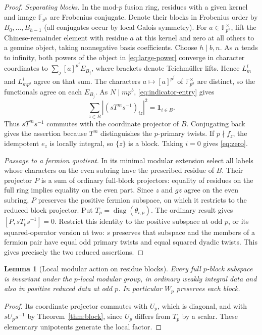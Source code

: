 \documentclass[11pt,a4paper]{article}
\numberwithin{equation}{section}
\newtheorem{lemma}[theorem]{Lemma}
\theoremstyle{remark}
\begin{document}
\begin{proof}
\emph{Separating blocks.}
In the mod-$p$ fusion ring, residues with a given kernel and image
$\mathbb F_{p^h}$ are Frobenius conjugate. Denote their blocks
in Frobenius order by $B_0,\ldots,B_{h-1}$ (all conjugates occur
by local Galois symmetry). For $a\in\mathbb F_{p^h}^{\times}$,
lift the Chinese-remainder element with residue $a$ at this kernel
and zero at all others to a genuine object, taking nonnegative
basis coefficients. Choose $h\mid b,n$. As $n$ tends to infinity,
both powers of the object in \eqref{eq:large-power} converge in
character coordinates to $\sum_j[a]^{p^j}E_{B_j}$, where brackets
denote Teichm\"uller lifts. Hence $L_m^i$ and $L_{mp^b}^i$ agree
on that sum. The characters $a\mapsto[a]^{p^j}$ of
$\mathbb F_{p^h}^\times$ are distinct, so the functionals agree on
each $E_{B_j}$. As $N\mid mp^b$, \eqref{eq:indicator-entry} gives
\begin{equation}\label{eq:block-projector-mass}
 \sum_{z\in B}|(sT^ms^{-1})_{iz}|^2=\mathbf1_{i\in B}.
\end{equation}
Thus $sT^ms^{-1}$ commutes with the coordinate projector of $B$.
Conjugating back gives the assertion because $T^m$ distinguishes
the $p$-primary twists. If $p\nmid f_z$, the idempotent $e_z$
is locally integral, so $\{z\}$ is a block. Taking $i=0$ gives
\eqref{eq:zero}.

\emph{Passage to a fermion quotient.}
In its minimal modular extension select all labels whose characters
on the even subring have the prescribed residue of $B$. Their
projector $P$ is a sum of ordinary full-block projectors: equality of
residues on the full ring implies equality on the even part. Since
$z$ and $gz$ agree on the even subring, $P$ preserves the positive
fermion subspace, on which it restricts to the reduced block
projector. Put $T_p=\operatorname{diag}(\theta_{i,p})$. The ordinary
result gives $[P,sT_ps^{-1}]=0$. Restrict this identity to the
positive subspace at odd $p$, or its squared-operator version at
two: $s$ preserves that subspace and the members of a fermion pair
have equal odd primary twists and equal squared dyadic twists.
This gives precisely the two reduced assertions.
\end{proof}

\begin{lemma}[Local modular action on residue blocks]\label{fam:M:3.2}\label{lem:local-block-invariance}
Every full $p$-block subspace is invariant under the $p$-local
modular group, in ordinary weakly integral data and also in
positive reduced data at odd $p$. In particular $W_p$ preserves
each block.
\end{lemma}
\begin{proof}
Its coordinate projector commutes with $U_p$, which is diagonal,
and with $sU_ps^{-1}$ by Theorem~\ref{thm:block}, since $U_p$
differs from $T_p$ by a scalar. These elementary unipotents
generate the local factor.
\end{proof}
\end{document}
